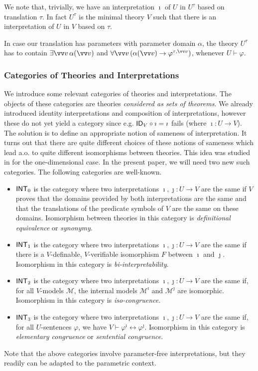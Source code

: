 \documentclass{amsart}
\renewcommand{\iff}{\leftrightarrow}
\renewcommand{\phi}{\varphi}
\newcommand{\mc}[1]{\mathcal #1}
\begin{document}
 We note that, trivially, we have an interpretation $\imath$ of $U$ in $U^\tau$ based on translation $\tau$.
 In fact $U^\tau$ is the minimal theory $V$ such that there is an interpretation of $U$ in $V$ based on $\tau$.

In case our translation has parameters with parameter domain $\alpha$, the theory $U^\tau$ has to contain
$\exists \vv v\, \alpha(\vv v)$ and $\forall \vv v\, (\alpha(\vv v) \to \phi^{\tau,\vv v})$, whenever $U \vdash \phi$.

\subsubsection{Categories of Theories and Interpretations}

We introduce some relevant categories of theories and interpretations. The objects of these categories are theories \emph{considered as sets of theorems}.
We already introduced identity interpretations and composition of
interpretations, however these do not yet yield a category since e.g. ${\sf ID}_V \circ \imath = \imath$ fails (where $\imath:U \to V$). The solution is to
define an appropriate notion of sameness of interpretation. It turns out that there are quite different choices of these notions of sameness which lead
a.o. to quite different isomorphisms between theories. This  idea was studied in \cite{viss:cate06} for the one-dimensional case. In the present paper,
we will need two new such categories. The following categories are well-known.

\begin{itemize}
    \item 
${\sf INT}_0$ is the category where two interpretations $\imath,\jmath:U \to V$ are
the same if $V$ proves that the domains provided by both interpretations are the same and that the translations of the predicate symbols of $V$ are the same on these domains.
Isomorphism between theories in this category is \emph{definitional equivalence} or \emph{synonymy}.
\item ${\sf INT}_1$ is the category where two interpretations $\imath,\jmath:U \to V$ are
the same if there is a $V$-definable, $V$-verifiable isomorphism $F$ between $\imath$ and $\jmath$. 
Isomorphism in this category is \emph{bi-interpretability}.
\item 
${\sf INT}_2$ is the category where two interpretations $\imath,\jmath:U \to V$ are
the same if, for all $V$-models $\mc M$, the internal models $\mc M^\imath$ and
$\mc M^\jmath$ are isomorphic. Isomorphism in this category is \emph{iso-congruence}.
\item 
${\sf INT}_3$ is the category where two interpretations $\imath,\jmath:U \to V$ are
the same if, for all $U$-sentences $\phi$, we have $V \vdash \phi^\imath \iff \phi^\jmath$.
Isomorphism in this category is \emph{elementary congruence} or \emph{sentential congruence}.
\end{itemize}
Note that the above categories involve parameter-free interpretations, but they readily can be adapted to the parametric context. 
\end{document}
